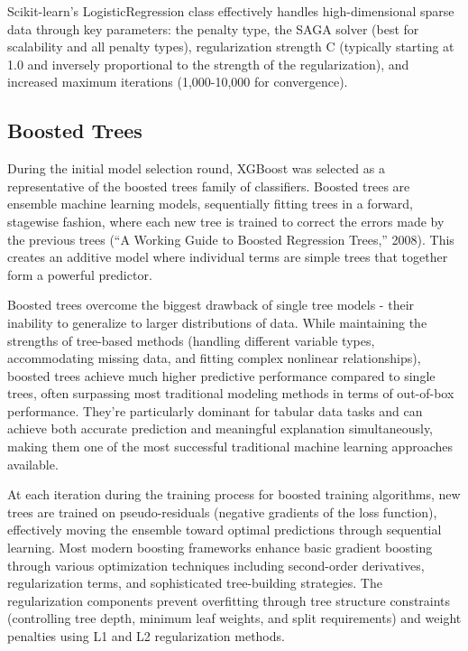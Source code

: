 \documentclass[
  titlepage]{article}
\begin{document}
Scikit-learn's LogisticRegression class effectively handles
high-dimensional sparse data through key parameters: the penalty type,
the SAGA solver (best for scalability and all penalty types),
regularization strength C (typically starting at 1.0 and inversely
proportional to the strength of the regularization), and increased
maximum iterations (1,000-10,000 for convergence).

\subsection{Boosted Trees}\label{boosted-trees}

During the initial model selection round, XGBoost was selected as a
representative of the boosted trees family of classifiers. Boosted trees
are ensemble machine learning models, sequentially fitting trees in a
forward, stagewise fashion, where each new tree is trained to correct
the errors made by the previous trees ({``A Working Guide to Boosted
Regression Trees,''} 2008). This creates an additive model where
individual terms are simple trees that together form a powerful
predictor.

Boosted trees overcome the biggest drawback of single tree models -
their inability to generalize to larger distributions of data. While
maintaining the strengths of tree-based methods (handling different
variable types, accommodating missing data, and fitting complex
nonlinear relationships), boosted trees achieve much higher predictive
performance compared to single trees, often surpassing most traditional
modeling methods in terms of out-of-box performance. They're
particularly dominant for tabular data tasks and can achieve both
accurate prediction and meaningful explanation simultaneously, making
them one of the most successful traditional machine learning approaches
available.

At each iteration during the training process for boosted training
algorithms, new trees are trained on pseudo-residuals (negative
gradients of the loss function), effectively moving the ensemble toward
optimal predictions through sequential learning. Most modern boosting
frameworks enhance basic gradient boosting through various optimization
techniques including second-order derivatives, regularization terms, and
sophisticated tree-building strategies. The regularization components
prevent overfitting through tree structure constraints (controlling tree
depth, minimum leaf weights, and split requirements) and weight
penalties using L1 and L2 regularization methods.
\end{document}
